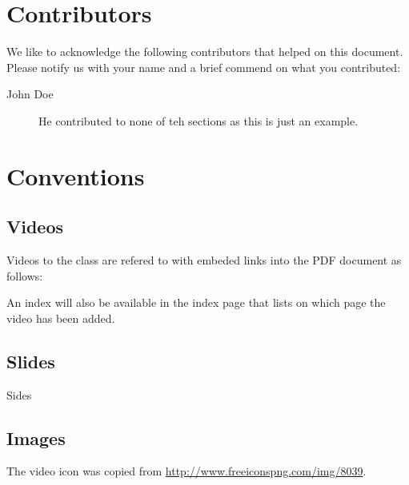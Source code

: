 \section{Contributors}

We like to acknowledge the following contributors that helped on this
document. Please notify us with your name and a brief commend on what
you contributed:

\begin{description}
\item[John Doe] He contributed to none of teh sections as this is just
  an example.
\end{description}

\section{Conventions}

\subsection{Videos}

Videos to the class are refered to with embeded links into the PDF
document as follows: 


An index will also be available in the index page
that lists on which page the video has been added.

\subsection{Slides}

Sides

\subsection{Images}

The video icon was copied from \url{http://www.freeiconspng.com/img/8039}.
